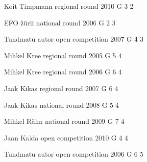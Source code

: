 \documentclass[11pt]{article}
\begin{document}
\ylDisplay{} %
{Koit Timpmann} %
{regional round} %
{2010} %
{G 3} %
{2} %
{

\ifEngStatement
\fi
}

\ylDisplay{} %
{EFO žürii} %
{national round} %
{2006} %
{G 2} %
{3} %
{

\ifEngStatement
\fi
}

\ylDisplay{} %
{Tundmatu autor} %
{open competition} %
{2007} %
{G 4} %
{3} %
{

\ifEngStatement
\fi
}

\ylDisplay{} %
{Mihkel Kree} %
{regional round} %
{2005} %
{G 5} %
{4} %
{

\ifEngStatement
\fi
}

\ylDisplay{} %
{Mihkel Kree} %
{regional round} %
{2006} %
{G 6} %
{4} %
{

\ifEngStatement
\fi
}

\ylDisplay{} %
{Jaak Kikas} %
{regional round} %
{2007} %
{G 6} %
{4} %
{

\ifEngStatement
\fi
}

\ylDisplay{} %
{Jaak Kikas} %
{national round} %
{2008} %
{G 5} %
{4} %
{

\ifEngStatement
\fi
}

\ylDisplay{} %
{Mihkel Rähn} %
{national round} %
{2009} %
{G 7} %
{4} %
{

\ifEngStatement
\fi
}

\ylDisplay{} %
{Jaan Kalda} %
{open competition} %
{2010} %
{G 4} %
{4} %
{

\ifEngStatement
\fi
}

\ylDisplay{} %
{Tundmatu autor} %
{open competition} %
{2006} %
{G 6} %
{5} %
{

\ifEngStatement
\fi
}
\end{document}
